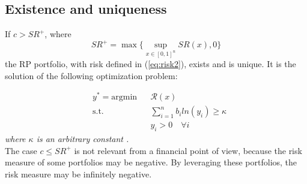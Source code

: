 \subsection{Existence and uniqueness}
\begin{theorem}
If $c > SR^+$, where
\begin{equation}
SR^+ = \max \big\{\sup_{x \in [0,1]^n} SR(x), 0\big\}
\end{equation}
the RP portfolio, with risk defined in (\ref{eq:risk2}), exists and is unique. It is the solution of the following optimization problem:
\end{theorem}
\begin{equation}
\begin{aligned}
& y^* = {\text{argmin}}
&& \mathcal{R}(x)\\
& \text{s.t.}
&&\sum_{i=1}^n b_i ln(y_i) \geq \kappa\\
&&&y_i > 0 \hspace{1em} \forall i
\end{aligned}
\end{equation}
\emph{where $\kappa$ is an arbitrary constant \cite{intr}.}\\
The case $c \leq SR^+$ is not relevant from a financial point of view, because the risk measure of some portfolios may be negative. By leveraging these portfolios, the risk measure may be infinitely negative.
